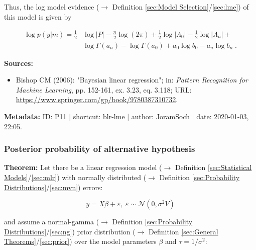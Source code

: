 \documentclass[a4paper,12pt,twoside]{book}
\begin{document}
Thus, the log model evidence ($\rightarrow$ Definition \ref{sec:Model Selection}/\ref{sec:lme}) of this model is given by

\begin{equation} \label{eq:blr-lme-GLM-NG-LME-s6}
\begin{split}
\log p(y|m) = \frac{1}{2} & \log |P| - \frac{n}{2} \log (2 \pi)  + \frac{1}{2} \log |\Lambda_0| - \frac{1}{2} \log |\Lambda_n| + \\
& \log \Gamma(a_n) - \log \Gamma(a_0) + a_0 \log b_0 - a_n \log b_n \; .
\end{split}
\end{equation}


\vspace{1em}
\textbf{Sources:}
\begin{itemize}
\item Bishop CM (2006): "Bayesian linear regression"; in: \textit{Pattern Recognition for Machine Learning}, pp. 152-161, ex. 3.23, eq. 3.118; URL: \url{https://www.springer.com/gp/book/9780387310732}.
\end{itemize}


\vspace{1em}
\textbf{Metadata:} ID: P11 | shortcut: blr-lme | author: JoramSoch | date: 2020-01-03, 22:05.
\vspace{1em}



\subsubsection[\textbf{Posterior probability of alternative hypothesis}]{Posterior probability of alternative hypothesis} \label{sec:blr-pp}
\setcounter{equation}{0}

\textbf{Theorem:} Let there be a linear regression model ($\rightarrow$ Definition \ref{sec:Statistical Models}/\ref{sec:mlr}) with normally distributed ($\rightarrow$ Definition \ref{sec:Probability Distributions}/\ref{sec:mvn}) errors:

\begin{equation} \label{eq:blr-pp-GLM}
y = X \beta + \varepsilon, \; \varepsilon \sim \mathcal{N}(0, \sigma^2 V)
\end{equation}

and assume a normal-gamma ($\rightarrow$ Definition \ref{sec:Probability Distributions}/\ref{sec:ng}) prior distribution ($\rightarrow$ Definition \ref{sec:General Theorems}/\ref{sec:prior}) over the model parameters $\beta$ and $\tau = 1/\sigma^2$:
\end{document}

